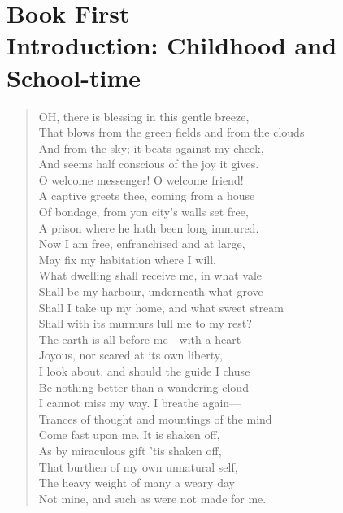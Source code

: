 ﻿\chapter*[Book First]{Book First \\ Introduction: Childhood and School-time}

\begin{verse} %
OH, there is blessing in this gentle breeze,  \\
That blows from the green fields and from the clouds  \\
And from the sky; it beats against my cheek,  \\
And seems half conscious of the joy it gives.  \\
O welcome messenger! O welcome friend!	  \\
A captive greets thee, coming from a house  \\
Of bondage, from yon city's walls set free,  \\
A prison where he hath been long immured.  \\
Now I am free, enfranchised and at large,  \\
May fix my habitation where I will.	  \\
What dwelling shall receive me, in what vale  \\
Shall be my harbour, underneath what grove  \\
Shall I take up my home, and what sweet stream  \\
Shall with its murmurs lull me to my rest?  \\
The earth is all before me---with a heart	  \\
Joyous, nor scared at its own liberty,  \\
I look about, and should the guide I chuse  \\
Be nothing better than a wandering cloud  \\
I cannot miss my way. I breathe again---  \\
Trances of thought and mountings of the mind	  \\
Come fast upon me. It is shaken off,  \\
As by miraculous gift 'tis shaken off,  \\
That burthen of my own unnatural self,  \\
The heavy weight of many a weary day  \\
Not mine, and such as were not made for me.	  \\

\end{verse}
